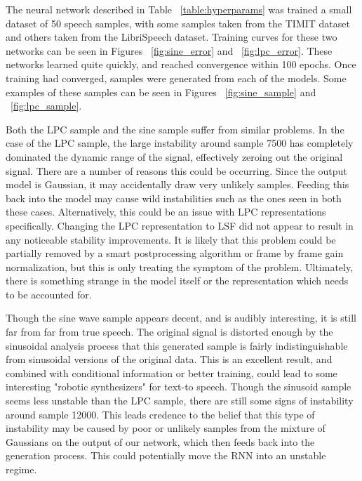 \documentclass{article} %
\begin{document}
The neural network described in Table ~\ref{table:hyperparams} was trained a
small dataset of 50 speech samples, with some samples taken from the
TIMIT dataset and others taken from the LibriSpeech dataset. Training curves
for these two networks can be seen in Figures ~\ref{fig:sine_error} and
~\ref{fig:lpc_error}. These networks learned quite quickly, and reached
convergence within 100 epochs. Once training had converged, samples were
generated from each of the models. Some examples of these samples can be seen
in Figures ~\ref{fig:sine_sample} and ~\ref{fig:lpc_sample}.
\par
Both the LPC sample and the sine sample suffer from similar problems. In the
case of the LPC sample, the large instability around sample 7500 has completely
dominated the dynamic range of the signal, effectively zeroing out the original
signal. There are a number of reasons this
could be occurring. Since the output model
is Gaussian, it may accidentally draw very unlikely samples. Feeding this back
into the model may cause wild instabilities such as the ones seen in both
these cases. Alternatively, this could be an issue with LPC representations
specifically. Changing the LPC representation to LSF did not appear
to result in any noticeable stability improvements. It is likely that this 
problem could be partially removed by a smart postprocessing algorithm or
frame by frame gain normalization, but this is only treating the symptom of the
problem. Ultimately, there is something strange in the model itself or the 
representation which needs to be accounted for.
\par
Though the sine wave sample appears decent, and is audibly interesting, it is
still far from  far from true speech. The original signal is
distorted enough by the sinusoidal analysis process that
this generated sample is fairly indistinguishable from sinusoidal
versions of the original data. This is an
excellent result, and combined with conditional information or better training,
could lead to some interesting "robotic synthesizers" for text-to speech.
Though the sinusoid sample seems less unstable than the LPC sample, there are 
still some signs of instability around sample 12000. This leads credence to the
belief that this type of instability may be caused by poor or unlikely samples
from the mixture of Gaussians on the output of our network, which then feeds
back into the generation process. This could potentially move the RNN into
an unstable regime.
\end{document}
